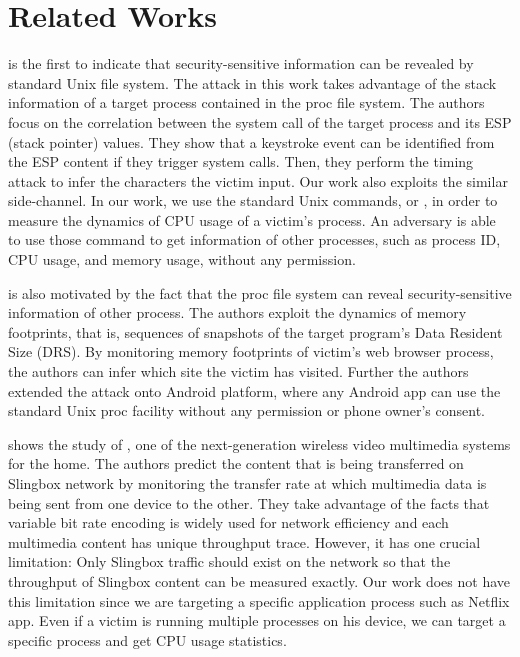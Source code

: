 \section{Related Works}
\label{sec:relatedworks}

\cite{Zhang:2009} is the first to indicate that security-sensitive information can be revealed by standard Unix  file system. 
The attack in this work takes advantage of the stack information of a target process contained in the proc file system. 
The authors focus on the correlation between the system call of the target process and its ESP (stack pointer) values. 
They show that a keystroke event can be identified from the ESP content if they trigger system calls.
Then, they perform the timing attack to infer the characters the victim input. 
Our work also exploits the similar side-channel. 
In our work, we use the standard Unix commands,  or , in order to measure the dynamics of CPU usage of a victim's process. 
An adversary is able to use those command to get information of other processes, such as process ID, CPU usage, and memory usage, without any permission. 

\cite{jana:memento} is also motivated by the fact that the proc file system can reveal security-sensitive information of other process. 
The authors exploit the dynamics of memory footprints, that is, sequences of snapshots of the target program's Data Resident Size (DRS).
By monitoring memory footprints of victim's web browser process, the authors can infer which site the victim has visited. 
Further the authors extended the attack onto Android platform, where any Android app can use the standard Unix proc facility without any permission or phone owner's consent. 

\cite{Saponas07devicesthat} shows the study of \cite{slingbox}, one of the next-generation wireless video multimedia systems for the home. 
The authors predict the content that is being transferred on Slingbox network by monitoring the transfer rate at which multimedia data is being sent from one device to the other. 
They take advantage of the facts that variable bit rate encoding is widely used for network efficiency and each multimedia content has unique throughput trace. 
However, it has one crucial limitation: Only Slingbox traffic should exist on the network so that the throughput of Slingbox content can be measured exactly. 
Our work does not have this limitation since we are targeting a specific application process such as Netflix app.
Even if a victim is running multiple processes on his device, we can target a specific process and get CPU usage statistics. 


